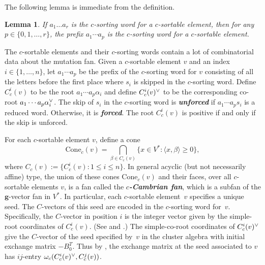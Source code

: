 \documentclass{amsart}
\newtheorem{lemma}[proposition]{Lemma}
\theoremstyle{definition}
\theoremstyle{remark}
\numberwithin{equation}{section}
\newcommand{\newword}[1]{\textbf{\emph{#1}}}
\newcommand{\set}[1]{{\lbrace #1 \rbrace}}
\newcommand{\br}[1]{{\langle #1 \rangle}}
\newcommand{\ck}{\spcheck}
\newcommand{\0}{{\mathbf{0}}}
\newcommand{\Cone}{\mathrm{Cone}}
\newcommand{\g}{\mathbf{g}}
\newcommand{\RSChar}{\Phi}
\newcommand{\RS}{\RSChar}
\begin{document}
The following lemma is immediate from the definition.
\begin{lemma}\label{any prefix}
If $a_1\ldots a_r$ is the $c$-sorting word for a $c$-sortable element, then for any $p\in\set{0,1,\ldots,r}$, the prefix $a_1\cdots a_p$ is the $c$-sorting word for a $c$-sortable element.
\end{lemma}


The $c$-sortable elements and their $c$-sorting words contain a lot of combinatorial data about the mutation fan.
Given a $c$-sortable element $v$ and an index $i\in\set{1,\ldots,n}$, let $a_1\cdots a_p$ be the prefix of the $c$-sorting word for $v$ consisting of all the letters before the first place where $s_i$ is skipped in the $c$-sorting word.
Define $C_c^i(v)$ to be the root $a_1\cdots a_p\alpha_i$ and define $C_c^i(v)\ck$ to be the corresponding co-root $a_1\cdots a_p\alpha\ck_i$.
The skip of $s_i$ in the $c$-sorting word is \newword{unforced} if $a_1\cdots a_ps_i$ is a reduced word.
Otherwise, it is \newword{forced}.
The root $C_c^i(v)$ is positive if and only if the skip is unforced.

For each $c$-sortable element $v$, define a cone  
\[\Cone_c(v)=\bigcap_{\beta \in C_c(v)}\set{x\in V^*:\br{x,\beta} \geq 0},\]
where $C_c(v):=\{C_c^i(v):1\le i\le n\}$.
In general acyclic (but not necessarily affine) type, the union of these cones $\Cone_c(v)$ and their faces, over all $c$-sortable elements $v$, is a fan called the \newword{$c$-Cambrian fan}, which is a subfan of the $\g$-vector fan in $V^*$.
In particular, each $c$-sortable element~$v$ specifies a unique seed.
The $C$-vectors of this seed are encoded in the $c$-sorting word for~$v$.
Specifically, the $C$-vector in position $i$ is the integer vector given by the simple-root coordinates of $C_c^i(v)$.
(See \cite[Therem~1.1]{framework} and \cite[Theorem~5.12]{framework}.)
The simple-co-root coordinates of $C_c^i(v)\ck$ give the $C$-vector of the seed specified by~$v$ in the cluster algebra with initial exchange matrix $-B_0^T$.
Thus by \cite[Theorem~1.1]{framework}, the exchange matrix at the seed associated to $v$ has $ij$-entry $\omega_c(C_c^i(v)\ck,C_c^j(v))$.
\end{document}
